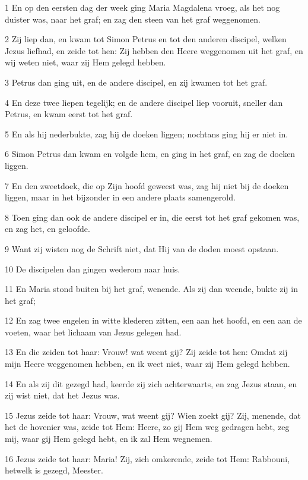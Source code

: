\par 1 En op den eersten dag der week ging Maria Magdalena vroeg, als het nog duister was, naar het graf; en zag den steen van het graf weggenomen.
\par 2 Zij liep dan, en kwam tot Simon Petrus en tot den anderen discipel, welken Jezus liefhad, en zeide tot hen: Zij hebben den Heere weggenomen uit het graf, en wij weten niet, waar zij Hem gelegd hebben.
\par 3 Petrus dan ging uit, en de andere discipel, en zij kwamen tot het graf.
\par 4 En deze twee liepen tegelijk; en de andere discipel liep vooruit, sneller dan Petrus, en kwam eerst tot het graf.
\par 5 En als hij nederbukte, zag hij de doeken liggen; nochtans ging hij er niet in.
\par 6 Simon Petrus dan kwam en volgde hem, en ging in het graf, en zag de doeken liggen.
\par 7 En den zweetdoek, die op Zijn hoofd geweest was, zag hij niet bij de doeken liggen, maar in het bijzonder in een andere plaats samengerold.
\par 8 Toen ging dan ook de andere discipel er in, die eerst tot het graf gekomen was, en zag het, en geloofde.
\par 9 Want zij wisten nog de Schrift niet, dat Hij van de doden moest opstaan.
\par 10 De discipelen dan gingen wederom naar huis.
\par 11 En Maria stond buiten bij het graf, wenende. Als zij dan weende, bukte zij in het graf;
\par 12 En zag twee engelen in witte klederen zitten, een aan het hoofd, en een aan de voeten, waar het lichaam van Jezus gelegen had.
\par 13 En die zeiden tot haar: Vrouw! wat weent gij? Zij zeide tot hen: Omdat zij mijn Heere weggenomen hebben, en ik weet niet, waar zij Hem gelegd hebben.
\par 14 En als zij dit gezegd had, keerde zij zich achterwaarts, en zag Jezus staan, en zij wist niet, dat het Jezus was.
\par 15 Jezus zeide tot haar: Vrouw, wat weent gij? Wien zoekt gij? Zij, menende, dat het de hovenier was, zeide tot Hem: Heere, zo gij Hem weg gedragen hebt, zeg mij, waar gij Hem gelegd hebt, en ik zal Hem wegnemen.
\par 16 Jezus zeide tot haar: Maria! Zij, zich omkerende, zeide tot Hem: Rabbouni, hetwelk is gezegd, Meester.
